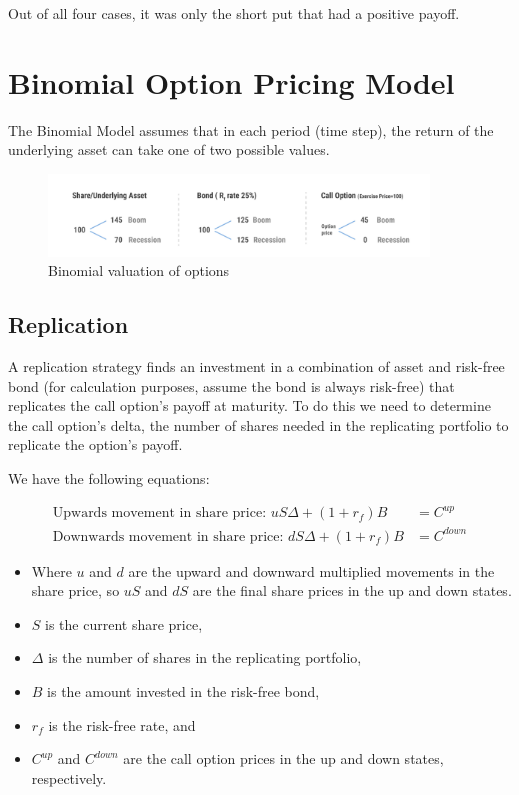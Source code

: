 Out of all four cases, it was only the short put that had a positive payoff. 

\section{Binomial Option Pricing Model}

The Binomial Model assumes that in each period (time step), the return of the underlying asset can take one of two possible values.

\begin{figure}[H]
    \centering
    \includegraphics[width=0.9\textwidth]{img/9.4.1.png}
    \caption{Binomial valuation of options}
    \label{fig:binomial}
\end{figure}

\subsection*{Replication}
A replication strategy finds an investment in a combination of asset and risk-free bond (for calculation purposes, assume the bond is always risk-free) that replicates the call option's payoff at maturity.  To do this we need to determine the call option's delta, the number of shares needed in the replicating portfolio to replicate the option's payoff.

We have the following equations:

\begin{align}
    \text{Upwards movement in share price: } uS\Delta + (1+r_f)B &= C^{up}\\
    \text{Downwards movement in share price: } dS\Delta + (1+r_f)B &= C^{down}
\end{align}

\begin{itemize}
    \item Where \( u \) and \( d \) are the upward and downward multiplied movements in the share price, so $uS$ and $dS$ are the final share prices in the up and down states.
    \item \( S \) is the current share price,
    \item \( \Delta \) is the number of shares in the replicating portfolio,
    \item \( B \) is the amount invested in the risk-free bond,
    \item \( r_f \) is the risk-free rate, and
    \item \( C^{up} \) and \( C^{down} \) are the call option prices in the up and down states, respectively.
\end{itemize}

